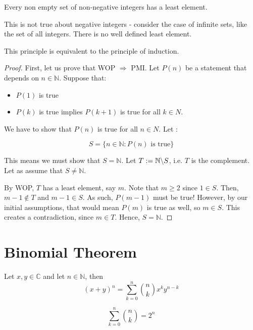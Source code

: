 \documentclass[12pt,letterpaper]{amsbook}
\theoremstyle{definition}
\newcommand{\N}{\mathbb{N}}
\newcommand{\C}{\mathbb{C}}
\begin{document}
\phantom{}

\begin{theorem}
  Every non empty set of non-negative integers has a least element.
\end{theorem}

This is not true about negative integers - consider the case of infinite sets, like the set of all integers. There is no well defined least element.

This principle is equivalent to the principle of induction.

\begin{proof}

First, let us prove that WOP $\Rightarrow$ PMI. Let $P(n)$ be a statement that depends on $n \in \N$. Suppose that:

\begin{itemize}
  \item $P(1)$ is true
  \item $P(k)$ is true implies $P(k+1)$ is true for all $k \in N$.
\end{itemize}

We have to show that $P(n)$ is true for all $n \in N$. Let :

\[S = \{n \in \N : P(n) \text{ is true} \}\]

This means we must show that $S = \N$. Let $T := \N \symbol{92} S$, i.e. $T$ is the complement. Let as assume that $S \neq \N$.

By WOP, $T$ has a least element, say $m$. Note that $m \geq 2$ since $1 \in S$. Then, $m-1 \notin T$ and $m-1 \in S$. As such, $P(m-1)$ must be true! However, by our initial assumptions, that would mean $P(m)$ is true as well, so $m \in S$. This creates a contradiction, since $m \in T$. Hence, $S = \N$.

\end{proof}


\section{Binomial Theorem}

\phantom{}

\begin{theorem}
  Let $x,y \in \C$ and let $n \in \N$, then 
  \[(x+y)^n = \sum_{k=0}^{n} {n \choose k} x^ky^{n-k}\]
\end{theorem}


\begin{corollary}
  \[\sum_{k=0}^n {n \choose k} = 2^n\]
\end{corollary}
\end{document}
